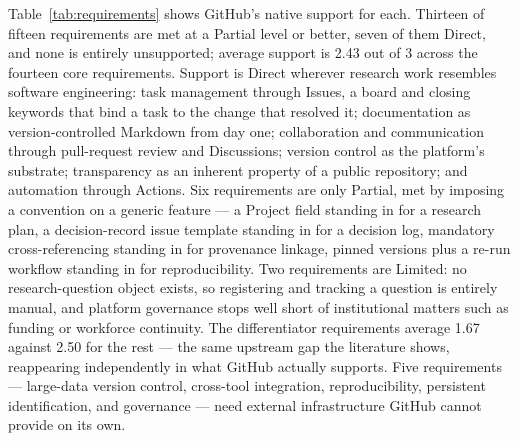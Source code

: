 \documentclass{IEEEcsmag}
\begin{document}
Table~\ref{tab:requirements} shows GitHub's native support for each. Thirteen of fifteen requirements are met at a Partial level or better, seven of them Direct, and none is entirely unsupported; average support is 2.43 out of 3 across the fourteen core requirements. Support is Direct wherever research work resembles software engineering: task management through Issues, a board and closing keywords that bind a task to the change that resolved it; documentation as version-controlled Markdown from day one; collaboration and communication through pull-request review and Discussions; version control as the platform's substrate; transparency as an inherent property of a public repository; and automation through Actions. Six requirements are only Partial, met by imposing a convention on a generic feature --- a Project field standing in for a research plan, a decision-record issue template standing in for a decision log, mandatory cross-referencing standing in for provenance linkage, pinned versions plus a re-run workflow standing in for reproducibility. Two requirements are Limited: no research-question object exists, so registering and tracking a question is entirely manual, and platform governance stops well short of institutional matters such as funding or workforce continuity. The differentiator requirements average 1.67 against 2.50 for the rest --- the same upstream gap the literature shows, reappearing independently in what GitHub actually supports. Five requirements --- large-data version control, cross-tool integration, reproducibility, persistent identification, and governance --- need external infrastructure GitHub cannot provide on its own.
\end{document}
